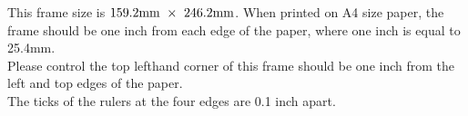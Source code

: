 \documentclass{article}
\begin{document}
\begin{minipage}{4in}
This frame size is $159.2{\rm mm}\ \times\ 246.2{\rm mm}$.
When printed on A4 size paper,
the frame should be one inch from each edge of the paper,
where one inch is equal to 25.4{\rm mm}.\\
Please control the top lefthand corner of this frame
should be one inch from the left and top edges of the paper.\\
The ticks of the rulers at the four edges are 0.1 inch apart.
\end{minipage}
\hfill\mbox{}

\vfill
\mbox{}
\end{document}
